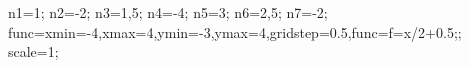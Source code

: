 \documentclass[exercice]{thedocument}%
\begin{document}
%
    \>n1=1;%
    \>n2=-2;%
    \>n3=1,5;%
    \>n4=-4;%
    \>n5=3;%
    \>n6=2,5;%
    \>n7=-2;%
    \>func={xmin=-4,xmax=4,ymin=-3,ymax=4,gridstep=0.5,func=f=x/2+0.5;};%
    \>scale=1;%
\end{document}
